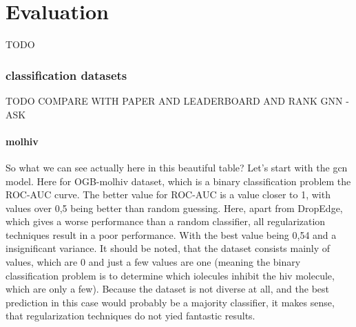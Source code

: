 %
\chapter{Evaluation}
\label{sec:eval}

\begin{table*}[t]
    \caption{
        TODO
    }\label{tbl:eval:results}
    \centering
    {\small%
        }
\end{table*}

\subsection{classification datasets}
TODO COMPARE WITH PAPER AND LEADERBOARD AND RANK GNN -ASK
\subsubsection{molhiv}
So what we can see actually here in this beautiful table? Let's start with the \ac{gcn} model. Here for OGB-molhiv dataset, which is a binary classification problem the ROC-AUC curve. The better value for ROC-AUC is a value closer to 1, with values over 0,5 being better than random guessing. Here, apart from DropEdge, which gives a worse performance than a random classifier, all regularization techniques result in a poor performance. With the best value being 0,54 and a insignificant variance. It should be noted, that the dataset consists mainly of values, which are 0 and just a few values are one (meaning the binary classification problem is to determine which iolecules inhibit the hiv molecule, which are only a few). Because the dataset is not diverse at all, and the best prediction in this case would probably be a majority classifier, it makes sense, that regularization techniques do not yied fantastic results.

